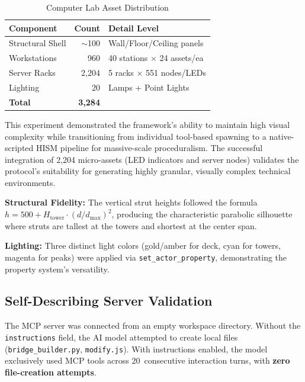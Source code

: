 \documentclass[conference]{IEEEtran}
\begin{document}
\begin{table}[htbp]
\caption{Computer Lab Asset Distribution}
\label{tab:lab}
\centering
\begin{tabular}{lrl}
\toprule
\textbf{Component} & \textbf{Count} & \textbf{Detail Level} \\
\midrule
Structural Shell & $\sim$100 & Wall/Floor/Ceiling panels \\
Workstations & 960 & 40 stations $\times$ 24 assets/ea \\
Server Racks & 2,204 & 5 racks $\times$ 551 nodes/LEDs \\
Lighting & 20 & Lamps + Point Lights \\
\midrule
\textbf{Total} & \textbf{3,284} & \\
\bottomrule
\end{tabular}
\end{table}

This experiment demonstrated the framework's ability to maintain high visual complexity while transitioning from individual tool-based spawning to a native-scripted HISM pipeline for massive-scale proceduralism. The successful integration of 2,204 micro-assets (LED indicators and server nodes) validates the protocol's suitability for generating highly granular, visually complex technical environments.

\textbf{Structural Fidelity:} The vertical strut heights followed the formula $h = 500 + H_{\text{tower}} \cdot (d/d_{\max})^2$, producing the characteristic parabolic silhouette where struts are tallest at the towers and shortest at the center span.

\textbf{Lighting:} Three distinct light colors (gold/amber for deck, cyan for towers, magenta for peaks) were applied via \texttt{set\_actor\_property}, demonstrating the property system's versatility.

\subsection{Self-Describing Server Validation}

The MCP server was connected from an empty workspace directory. Without the \texttt{instructions} field, the AI model attempted to create local files (\texttt{bridge\_builder.py}, \texttt{modify.js}). With instructions enabled, the model exclusively used MCP tools across 20~consecutive interaction turns, with \textbf{zero file-creation attempts}.

\end{document}
